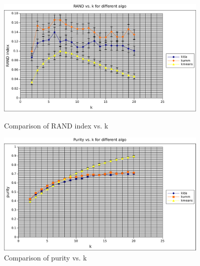 \begin{figure}
\label{fig:cl_cmp}
    \centering
    \begin{minipage}{0.45\textwidth}
        \centering
        \includegraphics[width=0.9\textwidth]{fig/rand_comp.pdf}
        \caption{Comparison of RAND index vs. k}
    \end{minipage}\hfill
    \begin{minipage}{0.45\textwidth}
        \centering
        \includegraphics[width=0.9\textwidth]{fig/purity_comp.pdf}
        \caption{Comparison of purity vs. k}
    \end{minipage}
\end{figure}
